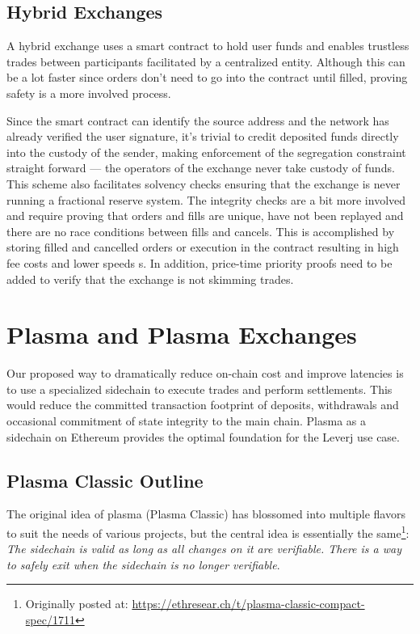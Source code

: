 \documentclass[12pt,a4paper]{article}
\begin{document}
\subsection{Hybrid Exchanges}
A hybrid exchange uses a smart contract to hold user funds and enables trustless trades between participants facilitated by a centralized entity. Although this can be a lot faster since orders don’t need to go into the contract until filled, proving safety is a more involved process\cite{levprotocol}.

Since the smart contract can identify the source address and the network has already verified the user signature, it's trivial to credit deposited funds directly into the custody of the sender, making enforcement of the segregation constraint straight forward — the operators of the exchange never take custody of funds.
This scheme also facilitates solvency checks ensuring that the exchange is never running a fractional reserve system. The integrity checks are a bit more involved and require proving that orders and fills are unique, have not been replayed and there are no race conditions between fills and cancels. This is accomplished by storing filled and cancelled orders or execution in the contract resulting in high fee costs and lower speeds
s\cite{WA17}. In addition, price-time priority proofs need to be added to verify that the exchange is not skimming trades.

\section{Plasma and Plasma Exchanges}
Our proposed way to dramatically reduce on-chain cost and improve latencies is to use a specialized sidechain to execute trades and perform settlements. This would reduce the committed transaction footprint of deposits, withdrawals and occasional commitment of state integrity to the main chain. Plasma as a sidechain on Ethereum provides the optimal foundation for the Leverj use case.

\subsection{Plasma Classic Outline}
The original idea of plasma (Plasma Classic) has blossomed into multiple flavors to suit the needs of various projects, but the central idea is essentially the same\footnote{Originally posted at: \url{https://ethresear.ch/t/plasma-classic-compact-spec/1711}}: \emph{The sidechain is valid as long as all changes on it are verifiable. There is a way to safely exit when the sidechain is no longer verifiable}.
\end{document}
